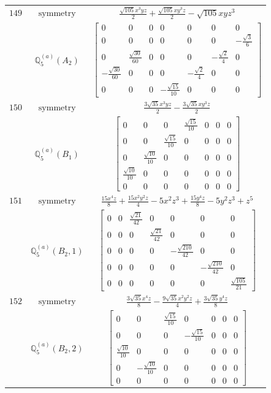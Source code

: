 \documentclass[fleqn,8pt,landscape]{jsarticle}
\begin{document}
\begin{longtable}{ccc}
$ 149 $ & $ \text{symmetry} $ & $ \frac{\sqrt{105} x^{3} y z}{2} + \frac{\sqrt{105} x y^{3} z}{2} - \sqrt{105} x y z^{3} $ \\
$  $ & $ \mathbb{Q}_{5}^{(a)}(A_{2}) $ & $ \begin{bmatrix} 0 & 0 & 0 & 0 & 0 & 0 & 0 \\ 0 & 0 & 0 & 0 & 0 & 0 & - \frac{\sqrt{3}}{6} \\ 0 & \frac{\sqrt{30}}{60} & 0 & 0 & 0 & - \frac{\sqrt{2}}{4} & 0 \\ - \frac{\sqrt{30}}{60} & 0 & 0 & 0 & - \frac{\sqrt{2}}{4} & 0 & 0 \\ 0 & 0 & 0 & - \frac{\sqrt{15}}{10} & 0 & 0 & 0 \end{bmatrix} $ \\ \hline
$ 150 $ & $ \text{symmetry} $ & $ \frac{3 \sqrt{35} x^{3} y z}{2} - \frac{3 \sqrt{35} x y^{3} z}{2} $ \\
$  $ & $ \mathbb{Q}_{5}^{(a)}(B_{1}) $ & $ \begin{bmatrix} 0 & 0 & 0 & \frac{\sqrt{15}}{10} & 0 & 0 & 0 \\ 0 & 0 & \frac{\sqrt{15}}{10} & 0 & 0 & 0 & 0 \\ 0 & \frac{\sqrt{10}}{10} & 0 & 0 & 0 & 0 & 0 \\ \frac{\sqrt{10}}{10} & 0 & 0 & 0 & 0 & 0 & 0 \\ 0 & 0 & 0 & 0 & 0 & 0 & 0 \end{bmatrix} $ \\ \hline
$ 151 $ & $ \text{symmetry} $ & $ \frac{15 x^{4} z}{8} + \frac{15 x^{2} y^{2} z}{4} - 5 x^{2} z^{3} + \frac{15 y^{4} z}{8} - 5 y^{2} z^{3} + z^{5} $ \\
$  $ & $ \mathbb{Q}_{5}^{(a)}(B_{2},1) $ & $ \begin{bmatrix} 0 & 0 & \frac{\sqrt{21}}{42} & 0 & 0 & 0 & 0 \\ 0 & 0 & 0 & \frac{\sqrt{21}}{42} & 0 & 0 & 0 \\ 0 & 0 & 0 & 0 & - \frac{\sqrt{210}}{42} & 0 & 0 \\ 0 & 0 & 0 & 0 & 0 & - \frac{\sqrt{210}}{42} & 0 \\ 0 & 0 & 0 & 0 & 0 & 0 & \frac{\sqrt{105}}{21} \end{bmatrix} $ \\ \hline
$ 152 $ & $ \text{symmetry} $ & $ \frac{3 \sqrt{35} x^{4} z}{8} - \frac{9 \sqrt{35} x^{2} y^{2} z}{4} + \frac{3 \sqrt{35} y^{4} z}{8} $ \\
$  $ & $ \mathbb{Q}_{5}^{(a)}(B_{2},2) $ & $ \begin{bmatrix} 0 & 0 & \frac{\sqrt{15}}{10} & 0 & 0 & 0 & 0 \\ 0 & 0 & 0 & - \frac{\sqrt{15}}{10} & 0 & 0 & 0 \\ \frac{\sqrt{10}}{10} & 0 & 0 & 0 & 0 & 0 & 0 \\ 0 & - \frac{\sqrt{10}}{10} & 0 & 0 & 0 & 0 & 0 \\ 0 & 0 & 0 & 0 & 0 & 0 & 0 \end{bmatrix} $ \\ \hline

\end{longtable}
\end{document}
